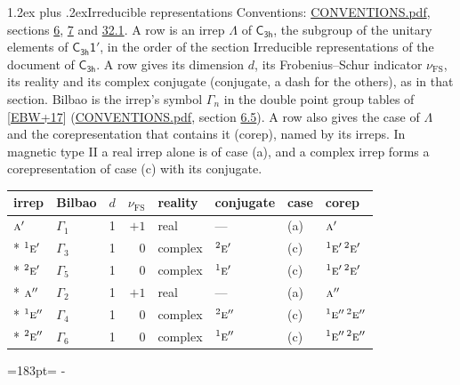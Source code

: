 \documentclass[10pt,a4paper]{article}
\makeatletter
\renewcommand\section{\@startsection{section}{1}{\z@}{-3ex plus -1ex minus -.2ex}%
  {1.2ex plus .2ex}{\normalfont\large\sffamily\bfseries\color{parttitle}}}
\newcommand{\needspace}[1]{\par\penalty-100\begingroup\dimen0=#1\relax\dimen2=\pagegoal
  \advance\dimen2-\pagetotal\ifdim\dimen0>\dimen2\relax\ifdim\dimen2>0pt\vfil\break\fi\fi
  \endgroup}
\numberwithin{equation}{section}
\newcommand{\grp}[1]{\mathsf{#1}}
\newcommand{\irr}[1]{\text{\normalfont\scshape #1}}
\newcommand{\conjpair}[1]{{}^{#1}}
\newcommand{\fsind}{\nu_{\mathrm{FS}}}
\makeatother
\begin{document}
\section{Irreducible representations}\label{s:irreps}
Conventions: \href{../../CONVENTIONS.pdf}{CONVENTIONS.pdf}, sections \href{../../../rotation/CONVENTIONS.pdf\#conv.6}{6}, \href{../../../rotation/CONVENTIONS.pdf\#conv.7}{7} and \href{../../CONVENTIONS.pdf\#conv.32.1}{32.1}.
\leavevmode\label{n:irrep.Delta}A row is an irrep $\Lambda$ of $\grp{C_{3h}}$, the subgroup of the unitary elements of $\grp{C_{3h}1'}$, in the order of the section Irreducible representations of the document of \href{../../../rotation/data/pdf/C3h.pdf}{$\grp{C_{3h}}$}. \label{n:index.dimension}\label{n:index.frobenius}\label{n:head.irrep}\label{n:head.reality}\label{n:head.conjugate}A row gives its dimension $d$, its Frobenius--Schur indicator $\fsind$, its reality and its complex conjugate (conjugate, a dash for the others), as in that section. \label{n:head.bilbao}\label{n:irrep.alias.gamma}Bilbao is the irrep's symbol $\Gamma_n$ in the double point group tables of [\href{../../../REFERENCES.pdf\#ref.EBW+17}{EBW+17}] (\href{../../CONVENTIONS.pdf}{CONVENTIONS.pdf}, section \href{../../../rotation/CONVENTIONS.pdf\#conv.6.5}{6.5}). \label{n:head.case.corep}\label{n:head.corep}A row also gives the case of $\Lambda$ and the corepresentation that contains it (corep), named by its irreps. In magnetic type II a real irrep alone is of case (a), and a complex irrep forms a corepresentation of case (c) with its conjugate.
\setlength{\emergencystretch}{2em}\par\setlength{\emergencystretch}{0pt}
{\small\renewcommand{\arraystretch}{1.25}\setlength{\tabcolsep}{4pt}\begin{longtable}{@{}llrrllll@{}}\toprule
irrep & Bilbao & $d$ & $\fsind$ & reality & conjugate & case & corep\\\midrule\endhead
\bottomrule\endfoot\endlastfoot
$\irr{a}'$ & $\Gamma_{1}$ & 1 & $+1$ & real & --- & (a) & $\irr{a}'$\\*
$\conjpair{1}\irr{e}'$ & $\Gamma_{3}$ & 1 & $0$ & complex & $\conjpair{2}\irr{e}'$ & (c) & $\conjpair{1}\irr{e}'\,\conjpair{2}\irr{e}'$\\*
$\conjpair{2}\irr{e}'$ & $\Gamma_{5}$ & 1 & $0$ & complex & $\conjpair{1}\irr{e}'$ & (c) & $\conjpair{1}\irr{e}'\,\conjpair{2}\irr{e}'$\\*
$\irr{a}''$ & $\Gamma_{2}$ & 1 & $+1$ & real & --- & (a) & $\irr{a}''$\\*
$\conjpair{1}\irr{e}''$ & $\Gamma_{4}$ & 1 & $0$ & complex & $\conjpair{2}\irr{e}''$ & (c) & $\conjpair{1}\irr{e}''\,\conjpair{2}\irr{e}''$\\*
$\conjpair{2}\irr{e}''$ & $\Gamma_{6}$ & 1 & $0$ & complex & $\conjpair{1}\irr{e}''$ & (c) & $\conjpair{1}\irr{e}''\,\conjpair{2}\irr{e}''$\\
\bottomrule\end{longtable}}
\needspace{183pt}
\end{document}
